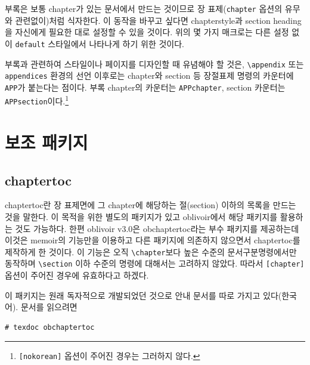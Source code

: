 \documentclass[
	12pt,
	a4paper,
	kosection,
	footnote,
	nobookmarks,
	microtype,
	figtabcapt,
]{oblivoir}
\def\cs#1{\texttt{\textbackslash #1}}
\begin{document}
부록은 보통 chapter가 있는 문서에서 만드는 것이므로 장 표제(\texttt{chapter} 옵션의 유무와 관련없이)처럼 식자한다.
이 동작을 바꾸고 싶다면 chapterstyle과 section heading을 자신에게
필요한 대로 설정할 수 있을 것이다. 위의 몇 가지 매크로는 다른 설정 없이
\texttt{default} 스타일에서 나타나게 하기 위한 것이다.

부록과 관련하여 스타일이나 페이지를 디자인할 때 유념해야 할 것은, \cs{appendix} 또는 \texttt{appendices} 환경의 선언 이후로는
chapter와 section 등 장절표제 명령의 카운터에 \verb|APP|가 붙는다는 점이다. 부록 chapter의 카운터는 \texttt{APPchapter}, section 카운터는 \texttt{APPsection}이다.\footnote{\texttt{[nokorean]} 옵션이 주어진 경우는 그러하지 않다.}

\section{보조 패키지}

\subsection{chaptertoc}

chaptertoc란 장 표제면에 그 chapter에 해당하는 절(section) 이하의 목록을
만드는 것을 말한다. 이 목적을 위한 별도의 패키지가 있고 oblivoir에서 해당 패키지를
활용하는 것도 가능하다. 한편 oblivoir v3.0은 \textsf{obchaptertoc}라는 부수
패키지를 제공하는데 이것은 \textsf{memoir}의 기능만을 이용하고 다른 패키지에
의존하지 않으면서 chaptertoc를 제작하게 한 것이다.
이 기능은 오직 \verb|\chapter|보다 높은 수준의 문서구분명령에서만 동작하며
\verb|\section| 이하 수준의 명령에 대해서는 고려하지 않았다. 따라서 \verb|[chapter]| 옵션이
주어진 경우에 유효하다고 하겠다.

\begin{boxedverbatim}
\usepackage{obchaptertoc}
\chaptertoc
\end{boxedverbatim}

이 패키지는 원래 독자적으로 개발되었던 것으로 안내 문서를 따로 가지고 있다(한국어).
문서를 읽으려면
\begin{verbatim}
# texdoc obchaptertoc
\end{verbatim}
\end{document}
